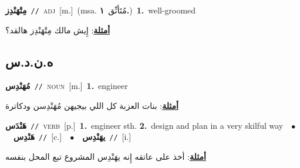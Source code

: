 \documentclass[10pt,a4paper,twoside]{article} %
\begin{document}
\begin{multicols}{2}
{\setlength\topsep{0pt}\textbf{\foreignlanguage{arabic}{مِتْهَنْدِز}}\ {\color{gray}\texttt{//}\color{black}}\ \textsc{adj}\ [m.]\ \color{gray}(msa. \foreignlanguage{arabic}{مُتَأنِّق}~\foreignlanguage{arabic}{\textbf{١.}})\color{black}\ \textbf{1.}~well-groomed\  \begin{flushright}\color{gray}\foreignlanguage{arabic}{\textbf{\underline{\foreignlanguage{arabic}{أمثلة}}}: إِيش مالك مِتْهَنْدِز هالقد؟}\end{flushright}\color{black}} \vspace{2mm}

\vspace{-3mm}
\subsection*{\color{blue}\foreignlanguage{arabic}{ه.ن.د.س}\color{blue}{}} 

{\setlength\topsep{0pt}\textbf{\foreignlanguage{arabic}{مُهَنْدِس}}\ {\color{gray}\texttt{//}\color{black}}\ \textsc{noun}\ [m.]\ \textbf{1.}~engineer\  \begin{flushright}\color{gray}\foreignlanguage{arabic}{\textbf{\underline{\foreignlanguage{arabic}{أمثلة}}}: بنات العزبة كل اللي بيجيهن مُهَنْدِسن ودكاترة}\end{flushright}\color{black}} \vspace{2mm}

{\setlength\topsep{0pt}\textbf{\foreignlanguage{arabic}{هَنْدَس}}\ {\color{gray}\texttt{//}\color{black}}\ \textsc{verb}\ [p.]\ \textbf{1.}~engineer sth.  \textbf{2.}~design and plan in a very skilful way\ \ $\bullet$\ \ \setlength\topsep{0pt}\textbf{\foreignlanguage{arabic}{هَنْدِس}}\ {\color{gray}\texttt{//}\color{black}}\ [c.]\ \ $\bullet$\ \ \setlength\topsep{0pt}\textbf{\foreignlanguage{arabic}{يهَنْدِس}}\ {\color{gray}\texttt{//}\color{black}}\ [i.]\  \begin{flushright}\color{gray}\foreignlanguage{arabic}{\textbf{\underline{\foreignlanguage{arabic}{أمثلة}}}: أخذ على عاتقه إِنه يهَنْدِس المشروع تبع المحل بنفسه}\end{flushright}\color{black}} \vspace{2mm}


\end{multicols}
\end{document}
